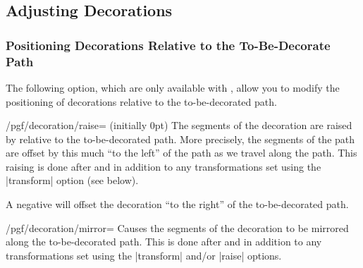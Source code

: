 \subsection{Adjusting Decorations}
\label{section-decorations-adjust}

\subsubsection{Positioning Decorations Relative to the To-Be-Decorate Path}

The following option, which are only available with \tikzname, allow you to
modify the positioning of decorations relative to the to-be-decorated path.

\begin{key}{/pgf/decoration/raise= (initially 0pt)}
    The segments of the decoration are raised by  relative to
    the to-be-decorated path. More precisely, the segments of the path are
    offset by this much ``to the left'' of the path as we travel along the
    path. This raising is done after and in addition to any transformations set
    using the |transform| option (see below).

    A negative  will offset the decoration ``to the right'' of
    the to-be-decorated path.
\begin{codeexample}[]
\end{codeexample}
\end{key}

\begin{key}{/pgf/decoration/mirror=}
    Causes the segments of the decoration to be mirrored along the
    to-be-decorated path. This is done after and in addition to any
    transformations set using the |transform| and/or |raise| options.
\begin{codeexample}[]
\end{codeexample}
\end{key}

